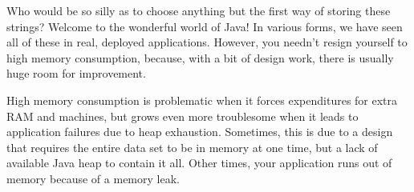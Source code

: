 
Who would be so silly as to choose anything but the first way of storing these
strings? Welcome to the wonderful world of Java! In various forms, we have seen
all of these in real, deployed applications. However, you needn't resign
yourself to high memory consumption, because, with a bit of design work, there
is usually huge room for improvement.

High memory consumption is problematic when it forces expenditures for extra RAM
and machines, but grows even more troublesome when it leads to application
failures due to heap exhaustion. Sometimes, this is due to a design that
requires the entire data set to be in memory at one time, but a lack of
available Java heap to contain it all. Other times, your application runs out of
memory because of a memory leak.


